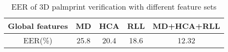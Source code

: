 \begin{table}[htbp]
  \centering
  \caption{EER of 3D palmprint verification with different feature sets}
    \begin{tabular}{|c|c|c|c|c|}
    \hline
    Global features & MD    & HCA   & RLL   & MD+HCA+RLL \\
    \hline
    EER(\%) & 25.8  & 20.4  & 18.6  & 12.32 \\
    \hline
    \end{tabular}%
  \label{tab:experiment:verification}%
\end{table}%
